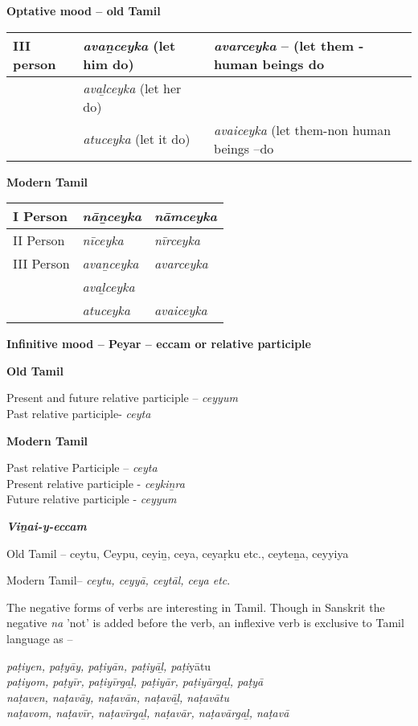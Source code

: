 \textbf{Optative mood – old Tamil}

\begin{longtable}{|l|l|p{3.8cm}|}
\hline
III person & \textit{avaṉceyka} (let him do) & \textit{avarceyka} – (let them - human beings do \\
\hline
 & \textit{avaḻceyka} (let her do) &  \tabularnewline
\hline
 & \textit{atuceyka} (let it do) & \textit{avaiceyka}  (let them-non human beings –do \tabularnewline
\hline
\end{longtable}

\textbf{Modern Tamil}

\begin{longtable}{|l|l|l|}
\hline
I Person & \textit{nāṉceyka} & \textit{nāmceyka} \\
\hline
II Person & \textit{nīceyka} & \textit{nīrceyka} \tabularnewline
\hline
III Person & \textit{avaṉceyka} & \textit{avarceyka} \tabularnewline
\hline
 & \textit{avaḻceyka} &  \tabularnewline
\hline
 & \textit{atuceyka} & \textit{avaiceyka} \tabularnewline
\hline
\end{longtable}

\textbf{Infinitive mood – Peyar – eccam or relative participle}

\vskip 3pt

\textbf{Old Tamil}

Present and future relative participle – \textit{ceyyum}\\ Past relative participle- \textit{ceyta}

\vskip 3pt

\textbf{Modern Tamil}

Past relative Participle – \textit{ceyta}\\ Present relative participle - \textit{ceykiṉra}\\ Future relative participle - \textit{ceyyum}

\vskip 3pt

\textbf{\textit{Viṉai-y-eccam}}

Old Tamil – ceytu, Ceypu, ceyiṉ, ceya, ceyaṛku etc., ceyteṉa, ceyyiya

Modern Tamil– \textit{ceytu, ceyyā, ceytāl, ceya etc}.

The negative forms of verbs are interesting in Tamil. Though in Sanskrit the negative \textit{na} 'not' is added before the verb, an inflexive verb is exclusive to Tamil language as –

\begin{myquote}
\textit{paṭiyen, paṭyāy, paṭiyān, paṭiyāḻ, paṭi}yātu\\\textit{paṭiyom, paṭyīr, paṭiyīrgaḻ, paṭiyār, paṭiyārgaḻ, paṭyā}\\\textit{naṭaven, naṭavāy, naṭavān, naṭavāḻ, naṭavātu}\\\textit{naṭavom, naṭavīr, naṭavīrgaḻ, naṭavār, naṭavārgaḻ, naṭavā}
\end{myquote}

